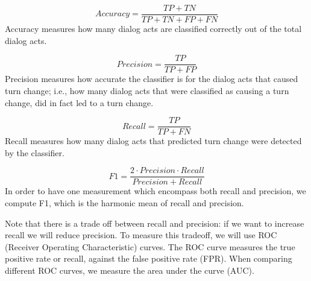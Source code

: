 \begin{equation}
Accuracy = \frac{TP + TN}{TP + TN + FP + FN}
\end{equation}
Accuracy measures how many dialog acts are classified correctly out of the total dialog acts.

\begin{equation}
Precision = \frac{TP }{TP + FP}
\end{equation}
Precision measures how accurate the classifier is for the dialog acts that caused turn change; i.e., how many dialog acts that were classified as causing a turn change, did in fact led to a turn change.


\begin{equation}
Recall = \frac{TP }{TP + FN}
\end{equation}
Recall measures how many dialog acts that predicted turn change were detected by the classifier.

\begin{equation}
F1 = \frac{2 \cdot Precision\cdot Recall}{Precision+ Recall}
\end{equation}
In order to have one measurement which encompass both recall and precision, we compute F1, which is the
harmonic mean of recall and precision.

Note that there is a trade off between recall and precision: if we want to increase recall we will reduce precision. To measure this tradeoff, we will use ROC (Receiver Operating Characteristic) curves.
The ROC curve measures the true positive rate or recall, against the false positive rate (FPR).
When comparing different ROC curves, we measure the area under the curve (AUC).

